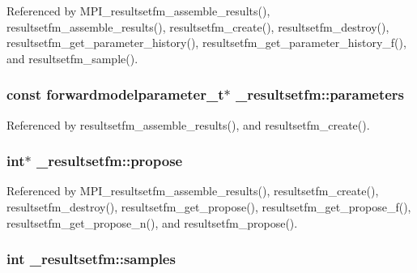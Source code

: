 Referenced by M\+P\+I\+\_\+resultsetfm\+\_\+assemble\+\_\+results(), resultsetfm\+\_\+assemble\+\_\+results(), resultsetfm\+\_\+create(), resultsetfm\+\_\+destroy(), resultsetfm\+\_\+get\+\_\+parameter\+\_\+history(), resultsetfm\+\_\+get\+\_\+parameter\+\_\+history\+\_\+f(), and resultsetfm\+\_\+sample().

\subsubsection[{\texorpdfstring{parameters}{parameters}}]{\setlength{\rightskip}{0pt plus 5cm}const {\bf forwardmodelparameter\+\_\+t}$\ast$ \+\_\+resultsetfm\+::parameters}\hypertarget{struct__resultsetfm_a12f7f8c09acf372bcf4ebd9a7c01ed34}{}\label{struct__resultsetfm_a12f7f8c09acf372bcf4ebd9a7c01ed34}


Referenced by resultsetfm\+\_\+assemble\+\_\+results(), and resultsetfm\+\_\+create().

\subsubsection[{\texorpdfstring{propose}{propose}}]{\setlength{\rightskip}{0pt plus 5cm}int$\ast$ \+\_\+resultsetfm\+::propose}\hypertarget{struct__resultsetfm_ac45cd3defd12dbbb212f3b6da70d1b52}{}\label{struct__resultsetfm_ac45cd3defd12dbbb212f3b6da70d1b52}


Referenced by M\+P\+I\+\_\+resultsetfm\+\_\+assemble\+\_\+results(), resultsetfm\+\_\+create(), resultsetfm\+\_\+destroy(), resultsetfm\+\_\+get\+\_\+propose(), resultsetfm\+\_\+get\+\_\+propose\+\_\+f(), resultsetfm\+\_\+get\+\_\+propose\+\_\+n(), and resultsetfm\+\_\+propose().

\subsubsection[{\texorpdfstring{samples}{samples}}]{\setlength{\rightskip}{0pt plus 5cm}int \+\_\+resultsetfm\+::samples}\hypertarget{struct__resultsetfm_acc38666e6a41cc97a06e3165a215f71d}{}\label{struct__resultsetfm_acc38666e6a41cc97a06e3165a215f71d}



